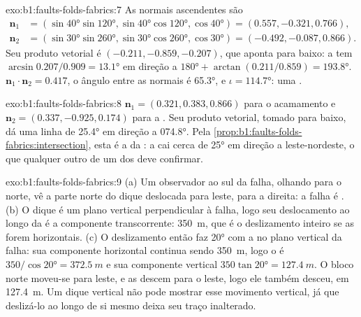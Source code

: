 \begin{solution}{exo:b1:faults-folds-fabrics:7}
As normais ascendentes são
\begin{align*}
  \mathbf n_1 &= (\sin\ang{40}\sin\ang{120}, \sin\ang{40}\cos\ang{120}, \cos\ang{40}) = (0.557, -0.321, 0.766),\\
  \mathbf n_2 &= (\sin\ang{30}\sin\ang{260}, \sin\ang{30}\cos\ang{260}, \cos\ang{30}) = (-0.492, -0.087, 0.866).
\end{align*}
Seu produto vetorial é
$(-0.211, -0.859, -0.207)$, que aponta para baixo: a  tem 
$\arcsin 0.207/0.909 = \ang{13.1}$ em direção a $\ang{180} + \arctan(0.211/0.859) =
\ang{193.8}$. $\mathbf n_1\cdot\mathbf n_2 = 0.417$, o ângulo entre as
normais é \ang{65.3}, e $\iota = \ang{114.7}$: uma .
\end{solution}

\begin{solution}{exo:b1:faults-folds-fabrics:8}
$\mathbf n_1 = (0.321, 0.383, 0.866)$ para o acamamento e
$\mathbf n_2 = (0.337, -0.925, 0.174)$ para a . Seu produto vetorial, tomado para baixo, dá uma linha de  \ang{25.4} em direção a \ang{074.8}. Pela
\cref{prop:b1:faults-folds-fabrics:intersection}, esta é a  da : a  cai cerca de \ang{25} em direção a leste-nordeste, o que qualquer outro  de um dos  deve confirmar.
\end{solution}

\begin{solution}{exo:b1:faults-folds-fabrics:9}
(a) Um observador ao sul da falha, olhando para o norte, vê a parte norte do dique deslocada para leste, para a direita: a falha é . (b) O dique é um plano vertical perpendicular à falha, logo seu deslocamento ao longo da  é a componente transcorrente: \qty{350}{m}, que é o deslizamento inteiro se as  forem horizontais. (c) O deslizamento então faz \ang{20} com a  no plano vertical da falha: sua componente horizontal continua sendo \qty{350}{m}, logo o  é $350/\cos\ang{20} = \qty{372.5}{m}$ e sua componente vertical $350\tan\ang{20} = \qty{127.4}{m}$. O bloco norte moveu-se para leste, e as  descem para o leste, logo ele também desceu, em \qty{127.4}{m}. Um dique vertical não pode mostrar esse movimento vertical, já que deslizá-lo ao longo de si mesmo deixa seu traço inalterado.
\end{solution}


